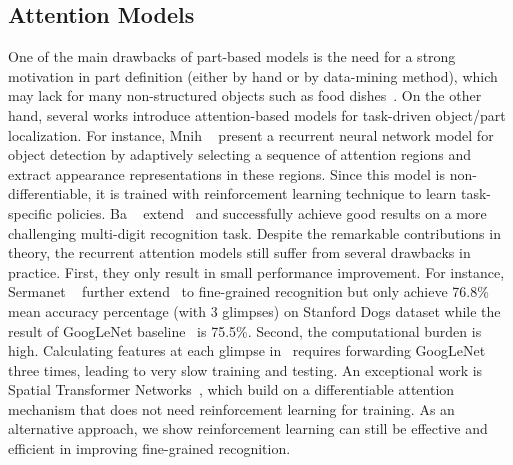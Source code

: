 \documentclass[10pt,twocolumn,letterpaper]{article}
\begin{document}
\subsection{Attention Models}
One of the main drawbacks of part-based models is the need for a strong motivation in part definition (either by hand or by data-mining method), which may lack for many non-structured objects such as food dishes~\cite{krause2016unreasonable}.
On the other hand, several works introduce attention-based models for task-driven object/part localization.
For instance, Mnih \etal~\cite{mnih2014recurrent} present a recurrent neural network model for object detection by adaptively selecting a sequence of attention regions and extract appearance representations in these regions.
Since this model is non-differentiable, it is trained with reinforcement learning technique to learn task-specific policies.
Ba \etal~\cite{ba2014multiple} extend~\cite{mnih2014recurrent} and successfully achieve good results on a more challenging multi-digit recognition task.
Despite the remarkable contributions in theory, the recurrent attention models still suffer from several drawbacks in practice.
First, they only result in small performance improvement.
For instance, Sermanet \etal~\cite{sermanet2014attention} further extend~\cite{ba2014multiple} to fine-grained recognition but only achieve 76.8\% mean accuracy percentage (with 3 glimpses) on Stanford Dogs dataset while the result of GoogLeNet baseline~\cite{szegedy2015going} is 75.5\%.
Second, the computational burden is high.
Calculating features at each glimpse in~\cite{sermanet2014attention} requires forwarding GoogLeNet three times, leading to very slow training and testing.
An exceptional work is Spatial Transformer Networks~\cite{jaderberg2015spatial}, which build on a differentiable attention mechanism that does not need reinforcement learning for training.
As an alternative approach, we show reinforcement learning can still be effective and efficient in improving fine-grained recognition.
\end{document}
